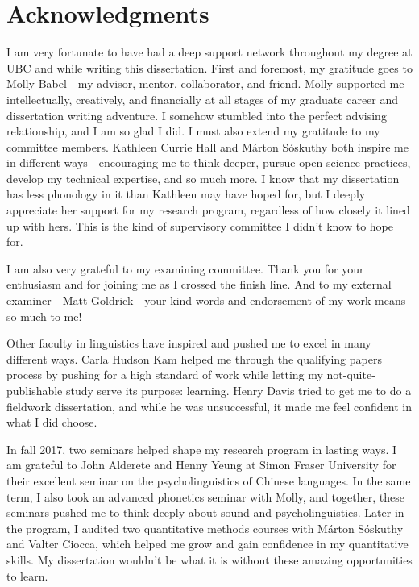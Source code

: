 
\chapter{Acknowledgments}

I am very fortunate to have had a deep support network throughout my degree at UBC and while writing this dissertation. First and foremost, my gratitude goes to Molly Babel---my advisor, mentor, collaborator, and friend. Molly supported me intellectually, creatively, and financially at all stages of my graduate career and dissertation writing adventure. I somehow stumbled into the perfect advising relationship, and I am so glad I did. I must also extend my gratitude to my committee members. Kathleen Currie Hall and Márton Sóskuthy both inspire me in different ways---encouraging me to think deeper, pursue open science practices, develop my technical expertise, and so much more. I know that my dissertation has less phonology in it than Kathleen may have hoped for, but I deeply appreciate her support for my research program, regardless of how closely it lined up with hers. This is the kind of supervisory committee I didn't know to hope for. 

I am also very grateful to my examining committee. Thank you for your enthusiasm and for joining me as I crossed the finish line. And to my external examiner---Matt Goldrick---your kind words and endorsement of my work means so much to me!

Other faculty in linguistics have inspired and pushed me to excel in many different ways. Carla Hudson Kam helped me through the qualifying papers process by pushing for a high standard of work while letting my not-quite-publishable study serve its purpose: learning. Henry Davis tried to get me to do a fieldwork dissertation, and while he was unsuccessful, it made me feel confident in what I did choose. 

In fall 2017, two seminars helped shape my research program in lasting ways. I am grateful to John Alderete and Henny Yeung at Simon Fraser University for their excellent seminar on the psycholinguistics of Chinese languages. In the same term, I also took an advanced phonetics seminar with Molly, and together, these seminars pushed me to think deeply about sound and psycholinguistics. Later in the program, I audited two quantitative methods courses with Márton Sóskuthy and Valter Ciocca, which helped me grow and gain confidence in my quantitative skills. My dissertation wouldn't be what it is without these amazing opportunities to learn.

